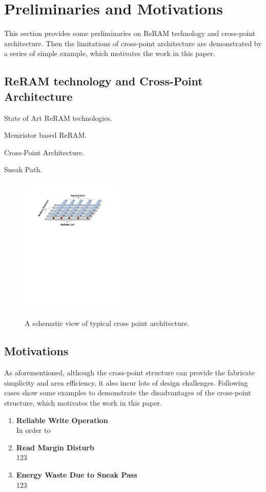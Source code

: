 \vspace{10pt}
\section{Preliminaries and Motivations}

This section provides some preliminaries on ReRAM technology and cross-point architecture. Then the limitations of cross-point architecture are demonstrated by a series of simple example, which motivates the work in this paper.

\subsection{ReRAM technology and Cross-Point Architecture}

State of Art ReRAM technologies.

Memristor based ReRAM.

Cross-Point Architecture.

Sneak Path.
\begin{figure}
\centering
  \includegraphics[width=0.45\textwidth]{./figures/crossbar_array.pdf}\\
  \caption{A schematic view of typical cross point architecture.}\label{fig:array}
\end{figure}

\subsection{Motivations}
As aforementioned, although the cross-point structure can provide the fabricate simplicity and area efficiency, it also incur lots of design challenges. Following cases show some examples to demonstrate the disadvantages of the cross-point structure, which motivates the work in this paper.
\begin{enumerate}
  \item \textbf{Reliable Write Operation}\\
  In order to 
  \item \textbf{Read Margin Disturb}\\
  123
  \item \textbf{Energy Waste Due to Sneak Pass}\\
  123
\end{enumerate}

~\cite{crossbar_NANO08_Nauenheim}~\cite{memristor:analog}~\cite{moore}

